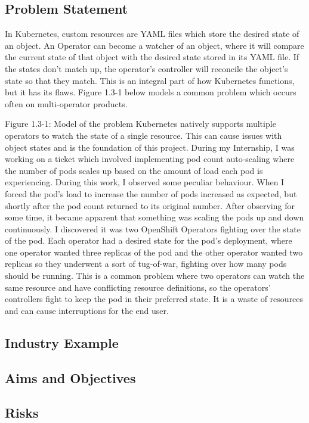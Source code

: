 \documentclass{article}
\begin{document}
\subsection{Problem Statement}
In Kubernetes, custom resources are YAML files which store the desired state of an object. An Operator can become a watcher of an object, where it will compare the current state of that object with the desired state stored in its YAML file. If the states don’t match up, the operator’s controller will reconcile the object’s state so that they match. This is an integral part of how Kubernetes functions, but it has its flaws. Figure 1.3-1 below models a common problem which occurs often on multi-operator products.

Figure 1.3-1: Model of the problem
Kubernetes natively supports multiple operators to watch the state of a single resource. This can cause issues with object states and is the foundation of this project. During my Internship, I was working on a ticket which involved implementing pod count auto-scaling where the number of pods scales up based on the amount of load each pod is experiencing. During this work, I observed some peculiar behaviour. When I forced the pod’s load to increase the number of pods increased as expected, but shortly after the pod count returned to its original number. After observing for some time, it became apparent that something was scaling the pods up and down continuously. I discovered it was two OpenShift Operators fighting over the state of the pod. Each operator had a desired state for the pod’s deployment, where one operator wanted three replicas of the pod and the other operator wanted two replicas so they underwent a sort of tug-of-war, fighting over how many pods should be running. This is a common problem where two operators can watch the same resource and have conflicting resource definitions, so the operators' controllers fight to keep the pod in their preferred state. It is a waste of resources and can cause interruptions for the end user.

\subsection{Industry Example}
\subsection{Aims and Objectives}
\subsection{Risks}
\end{document}
